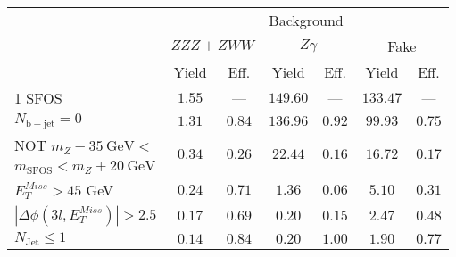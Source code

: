 \begin{tabular}{l||c|c||c|c||c|c}
\hline
 &       \multicolumn{6}{c}{Background}\\
 &  \multicolumn{2}{c||}{$ZZZ+ZWW$} & \multicolumn{2}{c||}{$Z\gamma$} & \multicolumn{2}{c}{Fake} \\ 
 & Yield & Eff. & Yield & Eff. & Yield & Eff. \\
\hline\hline
1 SFOS &  $1.55$ &  --- &  $149.60$ &  --- &  $133.47$ &  --- \\ 
\hline
$N_{\mathrm{b-jet}} = 0$ &  $1.31$ &  $0.84$ &  $136.96$ &  $0.92$ &  $99.93$ &  $0.75$ \\ 
\hline
NOT $m_Z - 35~\mathrm{GeV} <$  &  \multirow{2}{*}{$0.34$} &  \multirow{2}{*}{$0.26$} &  \multirow{2}{*}{$22.44$} &  \multirow{2}{*}{$0.16$} &  \multirow{2}{*}{$16.72$} &  \multirow{2}{*}{$0.17$} \\ 
$ m_{\mathrm{SFOS}} < m_Z + 20~\mathrm{GeV}$ & & & & & &  \\
\hline
$E_{T}^{Miss} > 45$ GeV &  $0.24$ &  $0.71$ &  $1.36$ &  $0.06$ &  $5.10$ &  $0.31$ \\ 
\hline
$|\Delta\phi(3l,E_{T}^{Miss})| > 2.5$ &  $0.17$ &  $0.69$ &  $0.20$ &  $0.15$ &  $2.47$ &  $0.48$ \\ 
\hline
$N_{\mathrm{Jet}} \leq 1$ &  $0.14$ &  $0.84$ &  $0.20$ &  $1.00$ &  $1.90$ &  $0.77$\\ 
\hline
\end{tabular}
